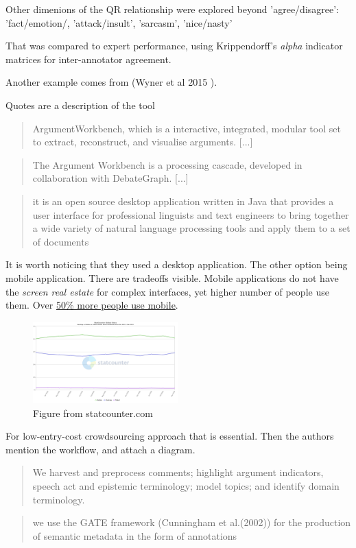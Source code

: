 \documentclass{report}
\begin{document}
{Other dimenions of the QR relationship were explored beyond 'agree/disagree': 'fact/emotion/, 'attack/insult', 'sarcasm', 'nice/nasty'

That was compared to expert performance, using Krippendorff's \textit{alpha} indicator matrices for inter-annotator agreement.

Another example comes from (Wyner et al 2015 ).

Quotes are a description of the tool
\begin{quote}
 ArgumentWorkbench, which is a interactive, integrated, modular tool set to extract, reconstruct, and visualise arguments. [...]
\end{quote}
\begin{quote}
 The Argument Workbench is a processing cascade, developed in collaboration with DebateGraph. [...]
\end{quote}
\begin{quote}
 it is an open source desktop application written in Java that provides a user interface for professional linguists and text engineers to bring together a wide variety of natural language processing tools and apply them to a set of documents
\end{quote}

It is worth noticing that they used a desktop application. The other option being mobile application. There are tradeoffs visible.
Mobile applications do not have the \textit{screen real estate} for complex interfaces, yet higher number of people use them. Over \href{https:\\gs.statcounter.com/platform-market-share/desktop-mobile-tablet}{50\% more people use mobile}.

\begin{figure}[h]
    \centering
    \includegraphics[width=0.5\textwidth]{./images/StatCounter-comparison-ww-monthly-202203-202303.png}
    \caption{Figure from statcounter.com}
\end{figure}


For low-entry-cost crowdsourcing approach that is essential.
Then the authors mention the workflow, and attach a diagram.
\begin{quote}
 We harvest and preprocess comments; highlight argument indicators, speech act and epistemic terminology; model topics; and identify domain terminology.
\end{quote}
\begin{quote}
 we use the GATE framework (Cunningham et al.(2002)) for the production of semantic metadata in the form of annotations
\end{quote}

}
\end{document}
